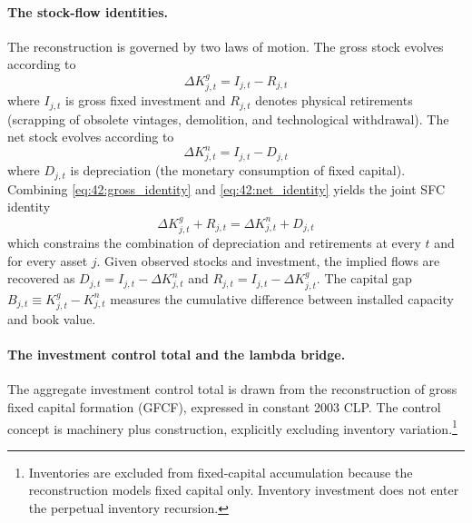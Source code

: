\paragraph{The stock-flow identities.}
The reconstruction is governed by two laws of motion. The gross
stock evolves according to
\begin{equation}
	\Delta K^{g}_{j,t} = I_{j,t} - R_{j,t}
	\label{eq:42:gross_identity}
\end{equation}
where $I_{j,t}$ is gross fixed investment and $R_{j,t}$ denotes
physical retirements (scrapping of obsolete vintages, demolition,
and technological withdrawal). The net stock evolves according to
\begin{equation}
	\Delta K^{n}_{j,t} = I_{j,t} - D_{j,t}
	\label{eq:42:net_identity}
\end{equation}
where $D_{j,t}$ is depreciation (the monetary consumption of fixed
capital). Combining \eqref{eq:42:gross_identity} and
\eqref{eq:42:net_identity} yields the joint SFC identity
\begin{equation}
	\Delta K^{g}_{j,t} + R_{j,t}
	= \Delta K^{n}_{j,t} + D_{j,t}
	\label{eq:42:joint_identity}
\end{equation}
which constrains the combination of depreciation and retirements at
every $t$ and for every asset $j$. Given observed stocks and
investment, the implied flows are recovered as $D_{j,t} = I_{j,t}
- \Delta K^{n}_{j,t}$ and $R_{j,t} = I_{j,t} - \Delta K^{g}_{j,t}$.
The capital gap $B_{j,t} \equiv K^{g}_{j,t} - K^{n}_{j,t}$ measures
the cumulative difference between installed capacity and book value.

\paragraph{The investment control total and the lambda bridge.}
The aggregate investment control total is drawn from the
\citet{PerezEyzaguirre2019} reconstruction of gross fixed capital
formation (GFCF), expressed in constant 2003 CLP. The control
concept is machinery plus construction, explicitly excluding
inventory variation.\footnote{Inventories are excluded from
	fixed-capital accumulation because the reconstruction models fixed
	capital only. Inventory investment does not enter the perpetual
	inventory recursion.}

